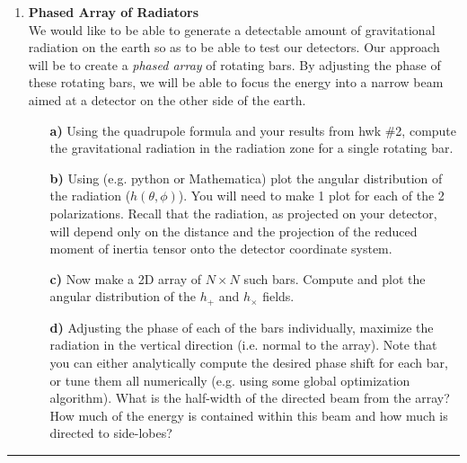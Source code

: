 \documentclass[11pt]{article}
\begin{document}
\begin{enumerate}
\clearpage
\item
{\bf Phased Array of Radiators} \\
We would like to be able to generate a detectable amount of gravitational radiation on the earth so as to be able to test our detectors. Our approach will be to create a \emph{phased array} of rotating bars. By adjusting the phase of these rotating bars, we will be able to focus the energy into a narrow beam aimed at a detector on the other side of the earth.
\begin{itemize}

\item[\bf a)] Using the quadrupole formula and your results from hwk \#2, compute the gravitational radiation in the radiation zone for a single rotating bar.

\item[\bf b)] Using (e.g. python or Mathematica) plot the angular distribution of the radiation ($h(\theta, \phi)$). You will need to make 1 plot for each of the 2 polarizations. Recall that the radiation, as projected on your detector, will depend only on the distance and the projection of the reduced moment of inertia tensor onto the detector coordinate system.

\item[\bf c)] Now make a 2D array of $N \times N$ such bars. Compute and plot the angular distribution of the $h_+$ and $h_{\times}$ fields.

\item[\bf d)] Adjusting the phase of each of the bars individually, maximize the radiation in the vertical direction (i.e. normal to the array). Note that you can either analytically compute the desired phase shift for each bar, or tune them all numerically (e.g. using some global optimization algorithm). What is the half-width of the directed beam from the array? How much of the energy is contained within this beam and how much is directed to side-lobes?

\end{itemize}



\end{enumerate}

\bigskip
{\color{Sepia} \hrule}
\end{document}
